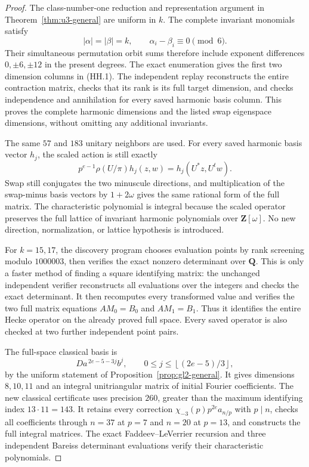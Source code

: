 \begin{proof}
The class-number-one reduction and representation argument in
Theorem~\ref{thm:u3-general} are uniform in \(k\).
The complete invariant monomials satisfy
\[
 |\alpha|=|\beta|=k,\qquad
 \alpha_i-\beta_i\equiv0\pmod6.
\]
Their simultaneous permutation orbit sums therefore include exponent
differences \(0,\pm6,\pm12\) in the present degrees.
The exact enumeration gives the first two dimension columns in (HH.1).
The independent replay reconstructs the entire contraction matrix,
checks that its rank is its full target dimension, and checks
independence and annihilation for every saved harmonic basis column.
This proves the complete harmonic dimensions and the listed swap
eigenspace dimensions, without omitting any additional invariants.

The same \(57\) and \(183\) unitary neighbors are used.
For every saved harmonic basis vector \(h_j\), the scaled action is
still exactly
\[
 p^{e-1}\rho(U/\pi)h_j(z,w)=h_j(U^*z,U^tw).
\]
Swap still conjugates the two minuscule directions, and multiplication
of the swap-minus basis vectors by \(1+2\omega\) gives the same rational
form of the full matrix. The characteristic polynomial is integral
because the scaled operator preserves the full lattice of invariant
harmonic polynomials over \(\mathbf Z[\omega]\). No new direction,
normalization, or lattice hypothesis is introduced.

For \(k=15,17\), the discovery program chooses evaluation
points by rank screening modulo \(1000003\), then verifies the exact
nonzero determinant over \(\mathbf Q\). This is only a faster method
of finding a square identifying matrix: the unchanged independent
verifier reconstructs all evaluations over the integers and checks
the exact determinant. It then recomputes every transformed value
and verifies the two full matrix equations \(AM_0=B_0\) and
\(AM_1=B_1\). Thus it identifies the entire Hecke operator on the
already proved full space. Every saved operator is also checked at
two further independent point pairs.

The full-space classical basis is
\[
 Da^{\,2e-5-3j}b^j,\qquad
 0\le j\le\left\lfloor(2e-5)/3\right\rfloor ,
\]
by the uniform statement of Proposition~\ref{prop:gl2-general}.
It gives dimensions \(8,10,11\) and an integral unitriangular matrix
of initial Fourier coefficients. The new classical certificate uses
precision \(260\), greater than the maximum identifying index
\(13\cdot11=143\). It retains every correction
\(\chi_{-3}(p)p^{2e}a_{n/p}\) with \(p\mid n\), checks all coefficients
through \(n=37\) at \(p=7\) and \(n=20\) at \(p=13\), and constructs
the full integral matrices. The exact Faddeev--LeVerrier recursion
and three independent Bareiss determinant evaluations verify their
characteristic polynomials.


\end{proof}
